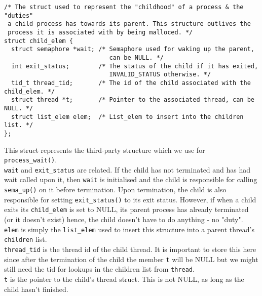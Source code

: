\documentclass[11pt, a4paper]{article}
\begin{document}
\begin{verbatim}
/* The struct used to represent the "childhood" of a process & the "duties"
 a child process has towards its parent. This structure outlives the
 process it is associated with by being malloced. */
struct child_elem { 
  struct semaphore *wait; /* Semaphore used for waking up the parent,
                             can be NULL. */
  int exit_status;        /* The status of the child if it has exited, 
                             INVALID_STATUS otherwise. */
  tid_t thread_tid;       /* The id of the child associated with the child_elem. */
  struct thread *t;       /* Pointer to the associated thread, can be NULL. */
  struct list_elem elem;  /* List_elem to insert into the children list. */
};
\end{verbatim}
This struct represents the third-party structure which we use for \verb|process_wait()|.\\
\verb|wait| and \verb|exit_status| are related. If the child has not terminated and has had
wait called upon it, then \verb|wait| is initialised and the child is responsible for
calling \verb|sema_up()| on it before termination. Upon termination, the child is also
responsible for setting \verb|exit_status()| to its exit status. However, if when
a child exits its \verb|child_elem| is set to NULL, its parent process
has already terminated (or it doesn't exist) hence, the child doesn't have to do
anything - no "duty". \\
\verb|elem| is simply the \verb|list_elem| used to insert this structure into a parent
thread's \verb|children| list.\\
\verb|thread_tid| is the thread id of the child thread. It is important to store
this here since after the termination of the child the member \verb|t| will be NULL
but we might still need the tid for lookups in the children list from
\verb|thread|.\\ 
\verb|t| is the pointer to the child's thread struct. This is not NULL, as long as
the child hasn't finished.
\end{document}
